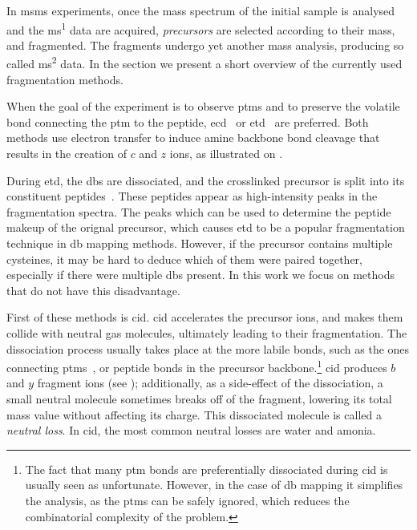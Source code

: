 In \gls*{msms} experiments, once the mass spectrum of the initial sample is analysed and the \gls*{ms}\textsuperscript{1} data are acquired, \emph{precursors} are selected according to their mass, and fragmented. The fragments undergo yet another mass analysis, producing so called \gls*{ms}\textsuperscript{2} data. In the section we present a short overview of the currently used fragmentation methods.

When the goal of the experiment is to observe \glspl*{ptm} and to preserve the volatile bond connecting the \gls*{ptm} to the peptide, \gls*{ecd}~\cite{zubarev2000electron} or \gls*{etd}~\cite{syka2004peptide} are preferred. Both methods use electron transfer to induce amine backbone bond cleavage that results in the creation of \(c\) and \(z\) ions, as illustrated on .

During \gls*{etd}, the \glspl*{db} are dissociated, and the crosslinked precursor is split into its constituent peptides~\cite{liu2014facilitating}. These peptides appear as high-intensity peaks in the fragmentation spectra. The peaks which can be used to determine the peptide makeup of the orignal precursor, which causes \gls*{etd} to be a popular fragmentation technique in \gls*{db} mapping methods. However, if the precursor contains multiple cysteines, it may be hard to deduce which of them were paired together, especially if there were multiple \glspl*{db} present. In this work we focus on methods that do not have this disadvantage.

First of these methods is \gls*{cid}. \gls*{cid} accelerates the precursor ions, and makes them collide with neutral gas molecules, ultimately leading to their fragmentation. The dissociation process usually takes place at the more labile bonds, such as the ones connecting \glspl*{ptm}~\cite{quan2013cid}, or peptide bonds in the precursor backbone.\footnote{The fact that many \gls*{ptm} bonds are preferentially dissociated during \gls*{cid} is usually seen as unfortunate. However, in the case of \gls*{db} mapping it simplifies the analysis, as the \glspl*{ptm} can be safely ignored, which reduces the combinatorial complexity of the problem.} \gls*{cid} produces \(b\) and \(y\) fragment ions (see ); additionally, as a side-effect of the dissociation, a small neutral molecule sometimes breaks off of the fragment, lowering its total mass value without affecting its charge. This dissociated molecule is called a \emph{neutral loss}. In \gls*{cid}, the most common neutral losses are water and amonia.

